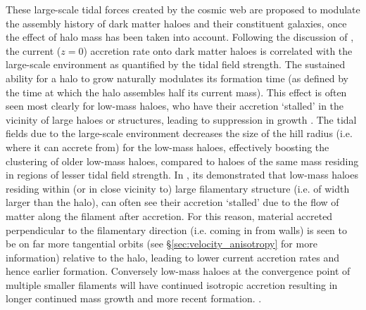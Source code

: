 
These large-scale tidal forces created by the cosmic web are proposed to modulate the assembly history of dark matter haloes and their constituent galaxies, once the effect of halo mass has been taken into account. Following the discussion of \citet{hahn2009}, the current ($z=0$) accretion rate onto dark matter haloes is correlated with the large-scale environment as quantified by the tidal field strength. The sustained ability for a halo to grow naturally modulates its formation time (as defined by the time at which the halo assembles half its current mass). This effect is often seen most clearly for low-mass haloes, who have their accretion `stalled' in the vicinity of large haloes or structures, leading to suppression in growth \citep[see also;][]{wang2007,dalal2008,lacerna2011}. The tidal fields due to the large-scale environment decreases the size of the hill radius (i.e. where it can accrete from) for the low-mass haloes, effectively boosting the clustering of older low-mass haloes, compared to haloes of the same mass residing in regions of lesser tidal field strength. In \citet{ZOMGI}, its demonstrated that low-mass haloes residing within (or in close vicinity to) large filamentary  structure (i.e. of width larger than the halo), can often see their accretion `stalled' due to the flow of matter along the filament after accretion. For this reason, material accreted perpendicular to the filamentary direction (i.e. coming in from walls) is seen to be on far more tangential orbits (see \S\ref{sec:velocity_anisotropy} for more information) relative to the halo, leading to lower current accretion rates and hence earlier formation. Conversely low-mass haloes at the convergence point of multiple smaller filaments will have continued isotropic accretion resulting in longer continued mass growth and more recent formation. \citep[See][for a theoretical approach]{musso2018}.

